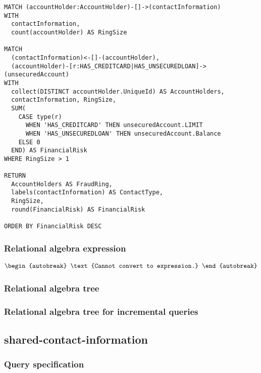 \begin{lstlisting}
MATCH (accountHolder:AccountHolder)-[]->(contactInformation)
WITH
  contactInformation,
  count(accountHolder) AS RingSize

MATCH
  (contactInformation)<-[]-(accountHolder),
  (accountHolder)-[r:HAS_CREDITCARD|HAS_UNSECUREDLOAN]->(unsecuredAccount)
WITH
  collect(DISTINCT accountHolder.UniqueId) AS AccountHolders,
  contactInformation, RingSize,
  SUM(
    CASE type(r)
      WHEN 'HAS_CREDITCARD' THEN unsecuredAccount.LIMIT
      WHEN 'HAS_UNSECUREDLOAN' THEN unsecuredAccount.Balance
    ELSE 0
  END) AS FinancialRisk
WHERE RingSize > 1

RETURN
  AccountHolders AS FraudRing,
  labels(contactInformation) AS ContactType,
  RingSize,
  round(FinancialRisk) AS FinancialRisk

ORDER BY FinancialRisk DESC
\end{lstlisting}

\subsubsection*{Relational algebra expression}

\begin{align*}
\begin{autobreak}
\text{Cannot convert to expression.}
\end{autobreak}
\end{align*}

\subsubsection*{Relational algebra tree}


\subsubsection*{Relational algebra tree for incremental queries}

\subsection{shared-contact-information}

\subsubsection*{Query specification}

